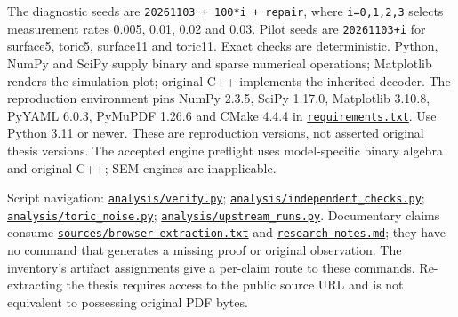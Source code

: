 \documentclass[11pt]{article}
\begin{document}
The diagnostic seeds are \texttt{20261103 + 100*i + repair}, where \texttt{i=0,1,2,3} selects measurement rates 0.005, 0.01, 0.02 and 0.03. Pilot seeds are \texttt{20261103+i} for surface5, toric5, surface11 and toric11. Exact checks are deterministic. Python, NumPy and SciPy supply binary and sparse numerical operations; Matplotlib renders the simulation plot; original C++ implements the inherited decoder. The reproduction environment pins NumPy 2.3.5, SciPy 1.17.0, Matplotlib 3.10.8, PyYAML 6.0.3, PyMuPDF 1.26.6 and CMake 4.4.4 in \href{https://github.com/alectionary/vibe-math/blob/master/formalization/quintavalle-hgp/requirements.txt}{\nolinkurl{requirements.txt}}. Use Python 3.11 or newer. These are reproduction versions, not asserted original thesis versions. The accepted engine preflight uses model-specific binary algebra and original C++; SEM engines are inapplicable.

Script navigation: \href{https://github.com/alectionary/vibe-math/blob/master/formalization/quintavalle-hgp/analysis/verify.py}{\nolinkurl{analysis/verify.py}}; \href{https://github.com/alectionary/vibe-math/blob/master/formalization/quintavalle-hgp/analysis/independent_checks.py}{\nolinkurl{analysis/independent_checks.py}}; \href{https://github.com/alectionary/vibe-math/blob/master/formalization/quintavalle-hgp/analysis/toric_noise.py}{\nolinkurl{analysis/toric_noise.py}}; \href{https://github.com/alectionary/vibe-math/blob/master/formalization/quintavalle-hgp/analysis/upstream_runs.py}{\nolinkurl{analysis/upstream_runs.py}}. Documentary claims consume \href{https://github.com/alectionary/vibe-math/blob/master/formalization/quintavalle-hgp/sources/browser-extraction.txt}{\nolinkurl{sources/browser-extraction.txt}} and \href{https://github.com/alectionary/vibe-math/blob/master/formalization/quintavalle-hgp/research-notes.md}{\nolinkurl{research-notes.md}}; they have no command that generates a missing proof or original observation. The inventory's artifact assignments give a per-claim route to these commands. Re-extracting the thesis requires access to the public source URL and is not equivalent to possessing original PDF bytes.
\end{document}
